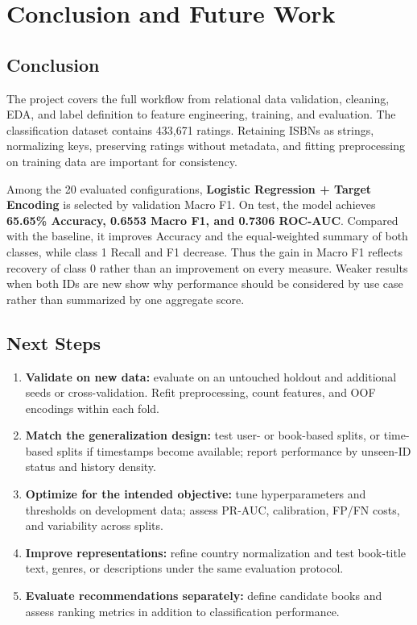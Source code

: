 \documentclass[12pt,a4paper]{article}
\begin{document}
\section{Conclusion and Future Work}
\subsection{Conclusion}
The project covers the full workflow from relational data validation, cleaning, EDA, and label
definition to feature engineering, training, and evaluation. The classification dataset contains
433,671 ratings. Retaining ISBNs as strings, normalizing keys, preserving ratings without metadata,
and fitting preprocessing on training data are important for consistency.

Among the 20 evaluated configurations, \textbf{Logistic Regression + Target Encoding} is selected
by validation Macro F1. On test, the model achieves \textbf{65.65\% Accuracy, 0.6553 Macro F1, and
0.7306 ROC-AUC}. Compared with the baseline, it improves Accuracy and the equal-weighted summary of both classes,
while class 1 Recall and F1 decrease. Thus the gain in Macro F1 reflects recovery of class 0 rather
than an improvement on every measure. Weaker results when both IDs are new show why performance should be considered
by use case rather than summarized by one aggregate score.

\Needspace{0.34\textheight}
\subsection{Next Steps}
\begin{enumerate}
  \item \textbf{Validate on new data:} evaluate on an untouched holdout and additional seeds or
  cross-validation. Refit preprocessing, count features, and OOF encodings within each fold.
  \item \textbf{Match the generalization design:} test user- or book-based splits, or time-based
  splits if timestamps become available; report performance by unseen-ID status and history density.
  \item \textbf{Optimize for the intended objective:} tune hyperparameters and thresholds on
  development data; assess PR-AUC, calibration, FP/FN costs, and variability across splits.
  \item \textbf{Improve representations:} refine country normalization and test book-title text,
  genres, or descriptions under the same evaluation protocol.
  \item \textbf{Evaluate recommendations separately:} define candidate books and assess ranking
  metrics in addition to classification performance.
\end{enumerate}
\end{document}
